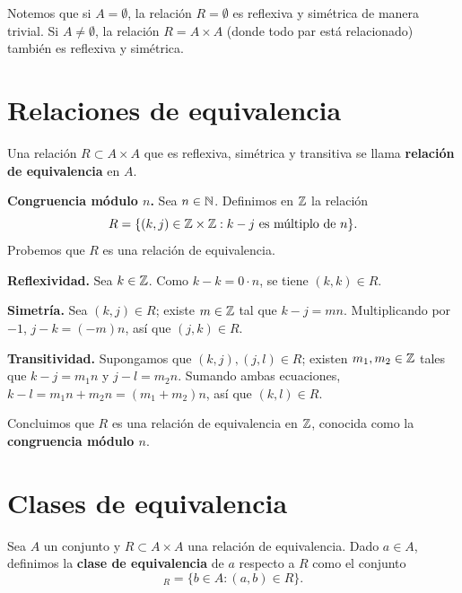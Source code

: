 \documentclass[12pt,a4paper]{book}
\begin{document}
    Notemos que si $A=\emptyset$, la relación $R=\emptyset$ es reflexiva y simétrica de manera trivial. Si $A\neq\emptyset$, la relación $R=A\times A$ (donde todo par está relacionado) también es reflexiva y simétrica.

    \section{Relaciones de equivalencia}

    \begin{definicion}
        Una relación $R\subset A\times A$ que es reflexiva, simétrica y transitiva se llama \textbf{relación de equivalencia} en $A$.
    \end{definicion}

    \begin{ejemplo}
        \textbf{Congruencia módulo $n$.}
        Sea $n\in\mathbb{N}$. Definimos en $\mathbb{Z}$ la relación
        \begin{equation*}
            R = \{(k,j)\in\mathbb{Z}\times\mathbb{Z} : k-j \text{ es múltiplo de } n\}.
        \end{equation*}
        Probemos que $R$ es una relación de equivalencia.

        \textbf{Reflexividad.} Sea $k\in\mathbb{Z}$. Como $k-k=0\cdot n$, se tiene $(k,k)\in R$.

        \textbf{Simetría.} Sea $(k,j)\in R$; existe $m\in\mathbb{Z}$ tal que $k-j=mn$. Multiplicando por $-1$, $j-k=(-m)n$, así que $(j,k)\in R$.

        \textbf{Transitividad.} Supongamos que $(k,j),(j,l)\in R$; existen $m_1,m_2\in\mathbb{Z}$ tales que $k-j=m_1n$ y $j-l=m_2n$. Sumando ambas ecuaciones, $k-l = m_1n+m_2n=(m_1+m_2)n$, así que $(k,l)\in R$.

        Concluimos que $R$ es una relación de equivalencia en $\mathbb{Z}$, conocida como la \textbf{congruencia módulo $n$}.
    \end{ejemplo}

    \section{Clases de equivalencia}

    \begin{definicion}
        Sea $A$ un conjunto y $R\subset A\times A$ una relación de equivalencia. Dado $a\in A$, definimos la \textbf{clase de equivalencia} de $a$ respecto a $R$ como el conjunto
        \begin{equation*}
            [a]_R = \{b\in A : (a,b)\in R\}.
        \end{equation*}
    \end{definicion}
\end{document}
